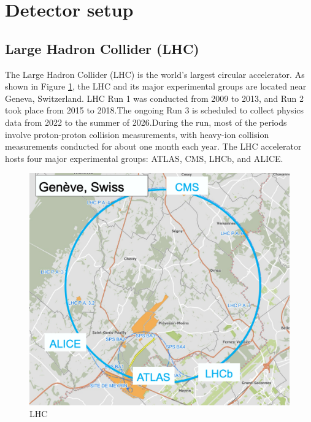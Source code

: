\newpage
\clearpage
\section{Detector setup}
    \subsection{Large Hadron Collider (LHC)}
        The Large Hadron Collider (LHC) is the world's largest circular accelerator. As shown in Figure \ref{LHC}, the LHC and its major experimental groups are located near Geneva, Switzerland. LHC Run 1 was conducted from 2009 to 2013, and Run 2 took place from 2015 to 2018.\@ The ongoing Run 3 is scheduled to collect physics data from 2022 to the summer of 2026.\@ During the run, most of the periods involve proton-proton collision measurements, with heavy-ion collision measurements conducted for about one month each year. The LHC accelerator hosts four major experimental groups: ATLAS, CMS, LHCb, and ALICE.\@
        \begin{figure}[htbp]
            \centering
            \includegraphics[keepaspectratio, scale=0.2]{fig/2_1_LHC_detecter.png}
            \caption{LHC}
            \label{LHC}
        \end{figure}
